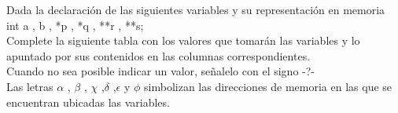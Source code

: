 \documentclass[12pt]{article} %
\begin{document}
\newpage

Dada la declaración de las siguientes variables y su representación en memoria \\
int	a , b , *p , *q , **r , **s;\\
Complete la siguiente tabla con los valores que tomarán las variables y lo apuntado por sus contenidos en las columnas correspondientes.\\
Cuando no sea posible indicar un valor, señalelo con el signo  -?-  \\
Las letras $\alpha$ , $\beta$ , $\chi$ ,$\delta$ ,$\epsilon$ y $\phi$ simbolizan las direcciones de memoria en las que se encuentran ubicadas las variables.\\ 
\noindent

\end{document}
